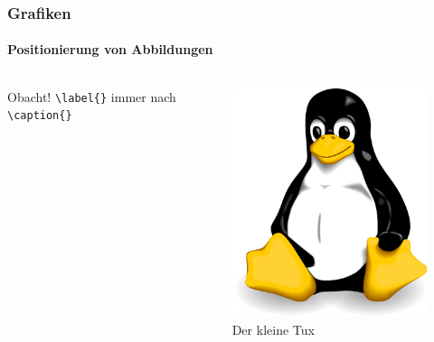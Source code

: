 
\begin{frame}
\frametitle{Grafiken}
\framesubtitle{Positionierung von Abbildungen}
\begin{columns}
\begin{column}{.5\textwidth}
{\ttfamily {\footnotesize
}}

\begin{alertblock}{Obacht!}
\texttt{\color{nounibaredI}\textbackslash label\color{black}\{\}} immer nach \texttt{\color{nounibaredI}\textbackslash caption\color{black}\{\}}
\end{alertblock}
\end{column}

\begin{column}{.5\textwidth} 
\begin{figure}
\begin{center}
    \includegraphics[width=\textwidth]{image/tux.png}
\caption{Der kleine Tux}
\label{img:kleinertux}
\end{center}
\end{figure}
\end{column}
\end{columns}
\end{frame}

